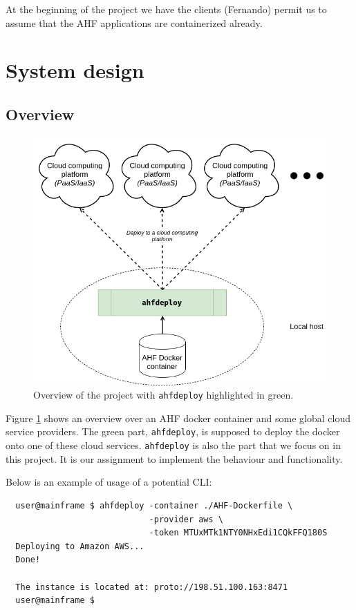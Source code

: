 \documentclass[a4paper,15pt,twoside]{article}
\begin{document}
At the beginning of the project we have the clients (Fernando) permit us to assume that the AHF applications are containerized already. 

\newpage
\section{System design}
\subsection{Overview}
\begin{figure}[H]
    \centering
    \includegraphics[keepaspectratio, width=14cm]{ahf_overview.png}
    \caption{Overview of the project with \texttt{ahfdeploy} highlighted in green.}
    \label{fig:overview}
\end{figure}

Figure \ref{fig:overview} shows an overview over an AHF docker container and some global cloud service providers. The green part, \texttt{ahfdeploy}, is supposed to deploy the docker onto one of these cloud services. \texttt{ahfdeploy} is also the part that we focus on in this project. It is our assignment to implement the behaviour and functionality.

Below is an example of usage of a potential CLI:
\bigskip
\midrule
\begin{verbatim}
  user@mainframe $ ahfdeploy -container ./AHF-Dockerfile \
                             -provider aws \
                             -token MTUxMTk1NTY0NHxEdi1CQkFFQ180S
  Deploying to Amazon AWS...
  Done!

  The instance is located at: proto://198.51.100.163:8471
  user@mainframe $ 
\end{verbatim}
\bigskip
\midrule
\end{document}
